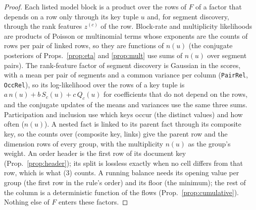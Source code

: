 \begin{proof}
Each listed model block is a product over the rows of $F$ of a factor that depends on a row only through its key tuple $u$ and, for segment discovery, through the rank features $z^{(c)}$ of the row. Block-rate and multiplicity likelihoods are products of Poisson or multinomial terms whose exponents are the counts of rows per pair of linked rows, so they are functions of $n(u)$ (the conjugate posteriors of Props.~\ref{prop:eta} and \ref{prop:mult} use sums of $n(u)$ over segment pairs). The rank-feature factor of segment discovery is Gaussian in the scores, with a mean per pair of segments and a common variance per column (\texttt{PairRel}, \texttt{OccRel}), so its log-likelihood over the rows of a key tuple is $a\,n(u)+b\,S_c(u)+c\,Q_c(u)$ for coefficients that do not depend on the rows, and the conjugate updates of the means and variances use the same three sums. Participation and inclusion use which keys occur (the distinct values) and how often ($n(u)$). A nested fact is linked to its parent fact through its composite key, so the counts over (composite key, links) give the parent row and the dimension rows of every group, with the multiplicity $n(u)$ as the group's weight. An order header is the first row of its document key (Prop.~\ref{prop:header}); its split is lossless exactly when no cell differs from that row, which is what (3) counts. A running balance needs its opening value per group (the first row in the rule's order) and its floor (the minimum); the rest of the column is a deterministic function of the flows (Prop.~\ref{prop:cumulative}). Nothing else of $F$ enters these factors.
\end{proof}

